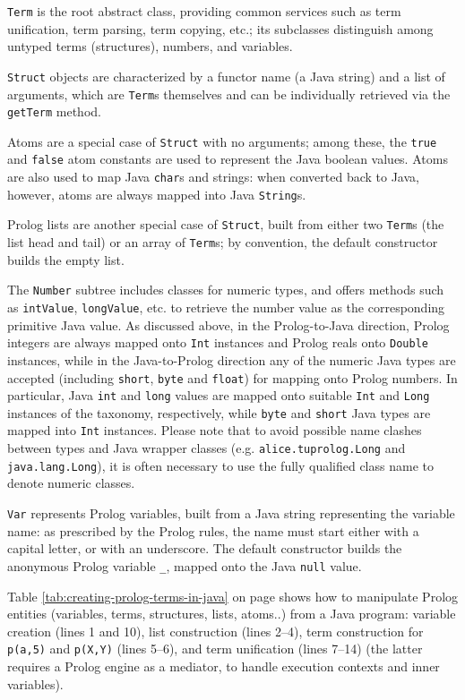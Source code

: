 \texttt{Term} is the root abstract class, providing common services such as term unification, term parsing, term copying, etc.; its subclasses distinguish among untyped terms (structures), numbers, and variables.

\texttt{Struct} objects are characterized by a functor name (a Java string) and
a list of arguments, which are \texttt{Term}s themselves and can be
individually retrieved via the \texttt{getTerm} method.

Atoms are a special case of \texttt{Struct} with no arguments; among these, the \texttt{true} and \texttt{false} atom constants are used to represent the Java boolean values.
Atoms are also used to map Java \texttt{char}s and strings: when converted back to Java, however, atoms are always mapped into Java \texttt{String}s.

Prolog lists are another special case of \texttt{Struct}, built from either
two \texttt{Term}s (the list head and tail) or an array of \texttt{Term}s; by
convention, the default constructor builds the empty list.

The \texttt{Number} subtree includes classes for numeric types, and offers methods such as \texttt{intValue}, \texttt{longValue}, etc. to retrieve the number value as the corresponding primitive Java value.
As discussed above, in the Prolog-to-Java direction, Prolog integers are always mapped onto \texttt{Int} instances and Prolog reals onto \texttt{Double} instances, while in the Java-to-Prolog direction any of the numeric Java types are accepted (including \texttt{short}, \texttt{byte} and \texttt{float}) for mapping onto Prolog numbers.
In particular, Java \texttt{int} and \texttt{long} values are mapped onto suitable \texttt{Int} and \texttt{Long} instances of the \tuprolog{} taxonomy, respectively, while \texttt{byte} and \texttt{short} Java types are mapped into \texttt{Int} instances.
Please note that to avoid possible name clashes between \tuprolog{} types and Java wrapper classes (e.g. \texttt{alice.tuprolog.Long} and \texttt{java.lang.Long}), it is often necessary to use the fully qualified class name to denote \tuprolog{} numeric classes.

\texttt{Var} represents Prolog variables, built from a Java string representing the variable name: as prescribed by the Prolog rules, the name must start either with a capital letter, or with an underscore.
The default constructor builds the anonymous Prolog variable \texttt{\_}, mapped onto the Java \texttt{null} value.

Table \ref{tab:creating-prolog-terms-in-java} on page \pageref{tab:creating-prolog-terms-in-java} shows how to manipulate Prolog entities (variables, terms, structures, lists, atoms..) from a Java program: variable creation (lines 1 and 10), list construction (lines 2--4), term construction for \texttt{p(a,5)} and \texttt{p(X,Y)} (lines 5--6), and term unification (lines 7--14) (the latter requires a Prolog engine as a mediator, to handle execution contexts and inner variables).

